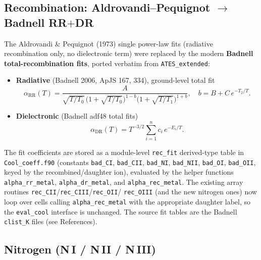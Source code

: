 \documentclass[english,a4paper]{my_memo}
\begin{document}
\subsection{Recombination: Aldrovandi--Pequignot $\rightarrow$ Badnell
RR$+$DR}

The Aldrovandi \& Pequignot (1973) single power-law fits
(radiative recombination only, no dielectronic term) were replaced by
the modern \textbf{Badnell total-recombination fits}, ported verbatim
from \texttt{ATES\_extended}:
\begin{itemize}
  \item \textbf{Radiative} (Badnell 2006, ApJS 167, 334), ground-level
    total fit
    \[
      \alpha_{\mathrm{RR}}(T) = \frac{A}
      {\sqrt{T/T_0}\,\bigl(1+\sqrt{T/T_0}\bigr)^{1-b}
                     \bigl(1+\sqrt{T/T_1}\bigr)^{1+b}},
      \quad b = B + C\,e^{-T_2/T}.
    \]
  \item \textbf{Dielectronic} (Badnell adf48 total fits)
    \[
      \alpha_{\mathrm{DR}}(T) = T^{-3/2}
      \sum_{i=1}^{n} c_i\,e^{-E_i/T}.
    \]
\end{itemize}
The fit coefficients are stored as a module-level \texttt{rec\_fit}
derived-type table in \texttt{Cool\_coeff.f90} (constants
\texttt{bad\_CI}, \texttt{bad\_CII}, \texttt{bad\_NI}, \texttt{bad\_NII},
\texttt{bad\_OI}, \texttt{bad\_OII}, keyed by the recombined/daughter
ion), evaluated by the helper functions \texttt{alpha\_rr\_metal},
\texttt{alpha\_dr\_metal}, and \texttt{alpha\_rec\_metal}.  The existing
array routines \texttt{rec\_CII}/\texttt{rec\_CIII}/\texttt{rec\_OII}/%
\texttt{rec\_OIII} (and the new nitrogen ones) now loop over cells
calling \texttt{alpha\_rec\_metal} with the appropriate daughter label,
so the \texttt{eval\_cool} interface is unchanged.  The source fit
tables are the Badnell \texttt{clist\_K} files (see References).

\subsection{Nitrogen (N\,I / N\,II / N\,III)}
\end{document}
